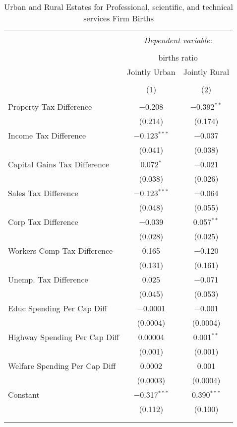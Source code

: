 
\begin{table}[!htbp] \centering 
  \caption{Urban and Rural Estates for  Professional, scientific, and technical services Firm Births} 
  \label{} 
\begin{tabular}{@{\extracolsep{5pt}}lcc} 
\\[-1.8ex]\hline 
\hline \\[-1.8ex] 
 & \multicolumn{2}{c}{\textit{Dependent variable:}} \\ 
\cline{2-3} 
\\[-1.8ex] & \multicolumn{2}{c}{births ratio} \\ 
 & Jointly Urban & Jointly Rural \\ 
\\[-1.8ex] & (1) & (2)\\ 
\hline \\[-1.8ex] 
 Property Tax Difference & $-$0.208 & $-$0.392$^{**}$ \\ 
  & (0.214) & (0.174) \\ 
  Income Tax Difference & $-$0.123$^{***}$ & $-$0.037 \\ 
  & (0.041) & (0.038) \\ 
  Capital Gains Tax Difference & 0.072$^{*}$ & $-$0.021 \\ 
  & (0.038) & (0.026) \\ 
  Sales Tax Difference & $-$0.123$^{***}$ & $-$0.064 \\ 
  & (0.048) & (0.055) \\ 
  Corp Tax Difference & $-$0.039 & 0.057$^{**}$ \\ 
  & (0.028) & (0.025) \\ 
  Workers Comp Tax Difference & 0.165 & $-$0.120 \\ 
  & (0.131) & (0.161) \\ 
  Unemp. Tax Difference & 0.025 & $-$0.071 \\ 
  & (0.045) & (0.053) \\ 
  Educ Spending Per Cap Diff & $-$0.0001 & $-$0.001 \\ 
  & (0.0004) & (0.0004) \\ 
  Highway Spending Per Cap Diff & 0.00004 & 0.001$^{**}$ \\ 
  & (0.001) & (0.001) \\ 
  Welfare Spending Per Cap Diff & 0.0002 & 0.001 \\ 
  & (0.0003) & (0.0004) \\ 
  Constant & $-$0.317$^{***}$ & 0.390$^{***}$ \\ 
  & (0.112) & (0.100) \\ 
 \hline \\[-1.8ex] 
\hline 
\hline \\[-1.8ex] 
\end{tabular} 
\end{table} 
